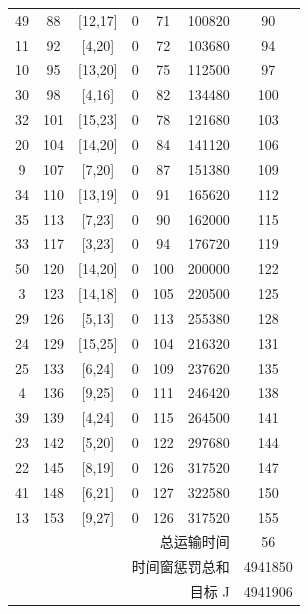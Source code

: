 \begin{table}[htbp]
\begin{tabular}{ccccccc}
49 & 88 & [12,17] & 0 & 71 & 100820 & 90 \\
11 & 92 & [4,20] & 0 & 72 & 103680 & 94 \\
10 & 95 & [13,20] & 0 & 75 & 112500 & 97 \\
30 & 98 & [4,16] & 0 & 82 & 134480 & 100 \\
32 & 101 & [15,23] & 0 & 78 & 121680 & 103 \\
20 & 104 & [14,20] & 0 & 84 & 141120 & 106 \\
9 & 107 & [7,20] & 0 & 87 & 151380 & 109 \\
34 & 110 & [13,19] & 0 & 91 & 165620 & 112 \\
35 & 113 & [7,23] & 0 & 90 & 162000 & 115 \\
33 & 117 & [3,23] & 0 & 94 & 176720 & 119 \\
50 & 120 & [14,20] & 0 & 100 & 200000 & 122 \\
3 & 123 & [14,18] & 0 & 105 & 220500 & 125 \\
29 & 126 & [5,13] & 0 & 113 & 255380 & 128 \\
24 & 129 & [15,25] & 0 & 104 & 216320 & 131 \\
25 & 133 & [6,24] & 0 & 109 & 237620 & 135 \\
4 & 136 & [9,25] & 0 & 111 & 246420 & 138 \\
39 & 139 & [4,24] & 0 & 115 & 264500 & 141 \\
23 & 142 & [5,20] & 0 & 122 & 297680 & 144 \\
22 & 145 & [8,19] & 0 & 126 & 317520 & 147 \\
41 & 148 & [6,21] & 0 & 127 & 322580 & 150 \\
13 & 153 & [9,27] & 0 & 126 & 317520 & 155 \\
\midrule
\multicolumn{6}{r}{总运输时间} & 56 \\
\multicolumn{6}{r}{时间窗惩罚总和} & 4941850 \\
\multicolumn{6}{r}{目标 J} & 4941906 \\
\bottomrule
\end{tabular}
\end{table}
